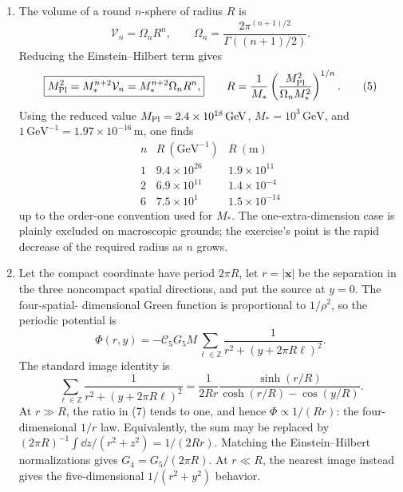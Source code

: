 \begin{enumerate}
\begin{enumerate}
    \item The volume of a round \(n\)-sphere of radius \(R\) is
      \[
        \mathcal V_n=\Omega_nR^n,
        \qquad
        \Omega_n=\frac{2\pi^{(n+1)/2}}
          {\Gamma((n+1)/2)}.
      \]
      Reducing the Einstein--Hilbert term gives
      \[
        \boxed{M_{\rm Pl}^2=M_*^{n+2}\mathcal V_n
          =M_*^{n+2}\Omega_nR^n,}
        \qquad
        R=\frac1{M_*}
          \left(\frac{M_{\rm Pl}^2}{\Omega_nM_*^2}\right)^{1/n}.
      \tag{5}
      \]
      Using the reduced value \(M_{\rm Pl}=2.4\times10^{18}\,\mathrm{GeV}\),
      \(M_*=10^3\,\mathrm{GeV}\), and
      \(1\,\mathrm{GeV}^{-1}=1.97\times10^{-16}\,\mathrm m\), one finds
      \[
      \begin{array}{c|c|c}
        n&R\ (\mathrm{GeV}^{-1})&R\ (\mathrm m)\\ \hline
        1&9.4\times10^{26}&1.9\times10^{11}\\
        2&6.9\times10^{11}&1.4\times10^{-4}\\
        6&7.5\times10^{1}&1.5\times10^{-14}
      \end{array}
      \]
      up to the order-one convention used for \(M_*\).  The
      one-extra-dimension case is plainly excluded on macroscopic grounds;
      the exercise's point is the rapid decrease of the required radius as
      \(n\) grows.

    \item Let the compact coordinate have period \(2\pi R\), let
      \(r=|\mathbf x|\) be the separation in the three noncompact spatial
      directions, and put the source at \(y=0\).  The four-spatial-
      dimensional Green function is proportional to \(1/\rho^2\), so the
      periodic potential is
      \[
        \Phi(r,y)=-\mathcal C_5G_5M
          \sum_{\ell\in\mathbb Z}
          \frac1{r^2+(y+2\pi R\ell)^2}.
      \tag{6}
      \]
      The standard image identity is
      \[
        \sum_{\ell\in\mathbb Z}
          \frac1{r^2+(y+2\pi R\ell)^2}
        =\frac1{2Rr}
          \frac{\sinh(r/R)}{\cosh(r/R)-\cos(y/R)}.
      \tag{7}
      \]
      At \(r\gg R\), the ratio in (7) tends to one, and hence
      \(\Phi\propto1/(Rr)\): the four-dimensional \(1/r\) law.  Equivalently,
      the sum may be replaced by
      \((2\pi R)^{-1}\int \dd z/(r^2+z^2)=1/(2Rr)\).  Matching the
      Einstein--Hilbert normalizations gives
      \(G_4=G_5/(2\pi R)\).  At \(r\ll R\), the nearest image instead gives
      the five-dimensional \(1/(r^2+y^2)\) behavior.
  \end{enumerate}


\end{enumerate}
